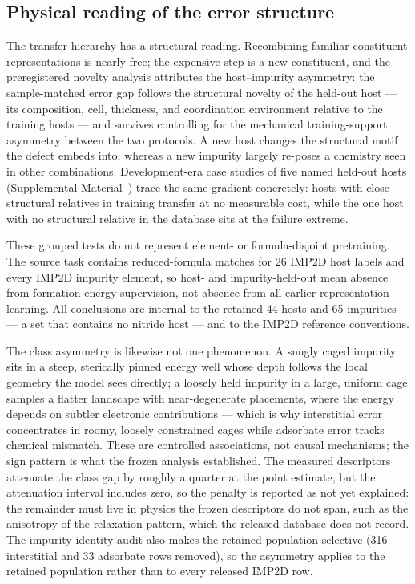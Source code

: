 
\ifprmresultsready

\subsection{Physical reading of the error structure}

The transfer hierarchy has a structural reading.  Recombining familiar
constituent representations is nearly free; the expensive step is a new
constituent, and the preregistered novelty analysis attributes the
host--impurity asymmetry: the sample-matched error gap follows the
structural novelty of the held-out host --- its composition, cell,
thickness, and coordination environment relative to the training hosts ---
and survives controlling for the mechanical training-support asymmetry
between the two protocols.  A new host changes the structural motif the
defect embeds into, whereas a new impurity largely re-poses a chemistry
seen in other combinations.  Development-era case studies of five named
held-out hosts (Supplemental Material~\cite{supplemental}) trace the same
gradient concretely: hosts with close structural relatives in training
transfer at no measurable cost, while the one host with no structural
relative in the database sits at the failure extreme.

These grouped tests do not represent element- or formula-disjoint
pretraining.  The source task contains reduced-formula matches for 26 IMP2D
host labels and every IMP2D impurity element, so host- and impurity-held-out
mean absence from formation-energy supervision, not absence from all earlier
representation learning.  All conclusions are internal to the retained 44
hosts and 65 impurities --- a set that contains no nitride host --- and to
the IMP2D reference conventions.

The class asymmetry is likewise not one phenomenon.  A snugly caged
impurity sits in a steep, sterically pinned energy well whose depth
follows the local geometry the model sees directly; a loosely held
impurity in a large, uniform cage samples a flatter landscape with
near-degenerate placements, where the energy depends on subtler electronic
contributions --- which is why interstitial error concentrates in roomy,
loosely constrained cages while adsorbate error tracks chemical mismatch.
These are controlled associations, not causal mechanisms; the sign pattern
is what the frozen analysis established.  The measured descriptors
attenuate the class gap by roughly a quarter at the point estimate, but
the attenuation interval includes zero, so the penalty is reported as not
yet explained: the remainder must live in physics the frozen descriptors
do not span, such as the anisotropy of the relaxation pattern, which the
released database does not record.  The impurity-identity audit also makes
the retained population selective (316 interstitial and 33 adsorbate rows
removed), so the asymmetry applies to the retained population rather than
to every released IMP2D row.

